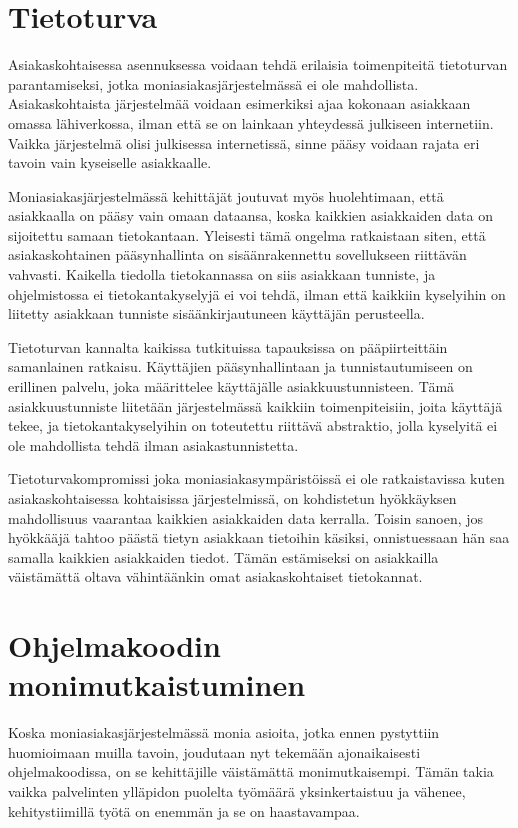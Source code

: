 \section{Tietoturva}
Asiakaskohtaisessa asennuksessa voidaan tehdä erilaisia toimenpiteitä tietoturvan parantamiseksi, jotka moniasiakasjärjestelmässä ei ole mahdollista. Asiakaskohtaista järjestelmää voidaan esimerkiksi ajaa kokonaan asiakkaan omassa lähiverkossa, ilman että se on lainkaan yhteydessä julkiseen internetiin. Vaikka järjestelmä olisi julkisessa internetissä, sinne pääsy voidaan rajata eri tavoin vain kyseiselle asiakkaalle.

Moniasiakasjärjestelmässä kehittäjät joutuvat myös huolehtimaan, että asiakkaalla on pääsy vain omaan dataansa, koska kaikkien asiakkaiden data on sijoitettu samaan tietokantaan. Yleisesti tämä ongelma ratkaistaan siten, että asiakaskohtainen pääsynhallinta on sisäänrakennettu sovellukseen riittävän vahvasti. Kaikella tiedolla tietokannassa on siis asiakkaan tunniste, ja ohjelmistossa ei tietokantakyselyjä ei voi tehdä, ilman että kaikkiin kyselyihin on liitetty asiakkaan tunniste sisäänkirjautuneen käyttäjän perusteella.

Tietoturvan kannalta kaikissa tutkituissa tapauksissa on pääpiirteittäin samanlainen ratkaisu. Käyttäjien pääsynhallintaan ja tunnistautumiseen on erillinen palvelu, joka määrittelee käyttäjälle asiakkuustunnisteen. Tämä asiakkuustunniste liitetään järjestelmässä kaikkiin toimenpiteisiin, joita käyttäjä tekee, ja tietokantakyselyihin on toteutettu riittävä abstraktio, jolla kyselyitä ei ole mahdollista tehdä ilman asiakastunnistetta.

Tietoturvakompromissi joka moniasiakasympäristöissä ei ole ratkaistavissa kuten asiakaskohtaisessa kohtaisissa järjestelmissä, on kohdistetun hyökkäyksen mahdollisuus vaarantaa kaikkien asiakkaiden data kerralla. Toisin sanoen, jos hyökkääjä tahtoo päästä tietyn asiakkaan tietoihin käsiksi, onnistuessaan hän saa samalla kaikkien asiakkaiden tiedot. Tämän estämiseksi on asiakkailla väistämättä oltava vähintäänkin omat asiakaskohtaiset tietokannat.

\section{Ohjelmakoodin monimutkaistuminen}
Koska moniasiakasjärjestelmässä monia asioita, jotka ennen pystyttiin huomioimaan muilla tavoin, joudutaan nyt tekemään ajonaikaisesti ohjelmakoodissa, on se kehittäjille väistämättä monimutkaisempi. Tämän takia vaikka palvelinten ylläpidon puolelta työmäärä yksinkertaistuu ja vähenee, kehitystiimillä työtä on enemmän ja se on haastavampaa.

